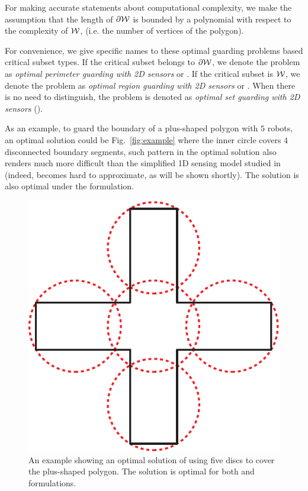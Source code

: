 For making accurate statements about computational complexity, we make
the assumption that the length of $\partial \mathcal W$ is bounded by a polynomial with respect 
to the complexity of $\mathcal W$, (i.e. the number of vertices of the polygon). 

For convenience, we give specific names to these optimal guarding 
problems based critical subset types. If the critical 
subset belongs to $\partial \mathcal W$, we denote the problem as {\em optimal 
perimeter guarding with 2D sensors} or \opgt. If the critical subset 
is $\mathcal W$, we denote the problem as {\em optimal region guarding with 
2D sensors} or \orgt. When there is no need to distinguish, the problem 
is denoted as {\em optimal set guarding with 2D sensors} (\osgt). 

As an example, to guard the boundary of a plus-shaped polygon with $5$ 
robots, an optimal solution could be Fig.~\ref{fig:example} where the 
inner circle covers $4$ disconnected boundary segments, such pattern 
in the optimal solution also renders \opgt much more difficult than 
the simplified 1D sensing model studied in \cite{FenHanGaoYuRSS19} 
(indeed, \opgt becomes hard to approximate, as will be shown shortly). 
The solution is also optimal under the \orgt formulation.
\begin{figure}[ht]
    \centering
		\vspace*{3mm}
    \includegraphics[scale=0.35]{chapters/osg/figures/exp_fig-e-eps-converted-to.pdf}
		\vspace*{1.5mm}
    \caption{An example showing an optimal solution of using five discs
		to cover the plus-shaped polygon. The solution is optimal for both 
		\opgt and \orgt formulations.}
    \label{fig:osg-example}
\end{figure}

